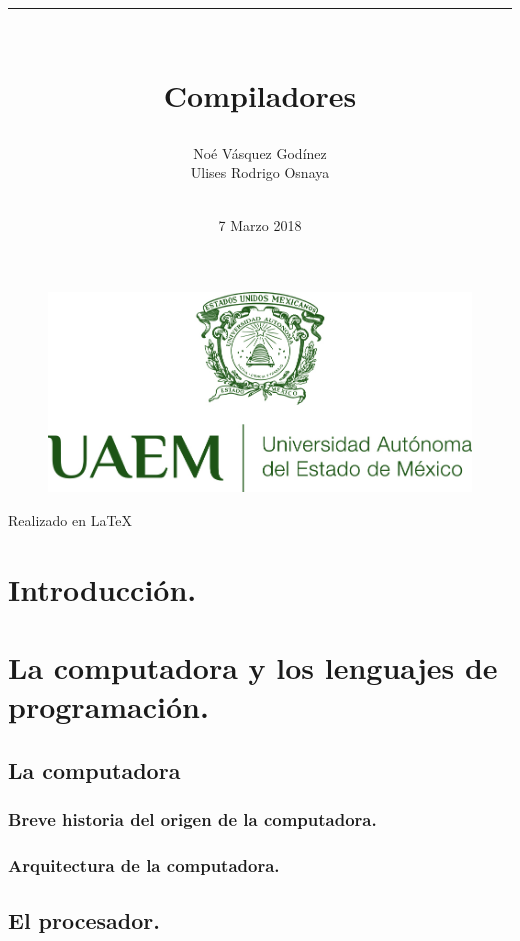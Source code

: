 \documentclass[12pt,letterpaper,openright]{article}
\title{\rule{14cm}{0.1mm}\\ Compiladores \\ }
\author{Noé Vásquez Godínez  \\ Ulises Rodrigo Osnaya  \\ 
       \rule{14cm}{0.1mm}
       }
\date{7 Marzo 2018}
\begin{document}
	\begin{titlepage}
		\maketitle
		\begin{figure}[h]
		\includegraphics[scale=2]{logo.jpg}
		\centering
		\end{figure}
		\center Realizado en \LaTeX
\end{titlepage}

\begin{abstract}
\end{abstract}
\newpage
\thispagestyle{empty}
\tableofcontents{}
\newpage
\thispagestyle{empty}
\listoffigures
\newpage
{}
\newpage

\section{Introducción.}
\newpage
\section{La computadora y los lenguajes de programación.}
	\subsection{La computadora}
		\subsubsection{Breve historia del origen de la computadora.}
		\subsubsection{Arquitectura de la computadora.}
	\subsection{El procesador.}
\end{document}
